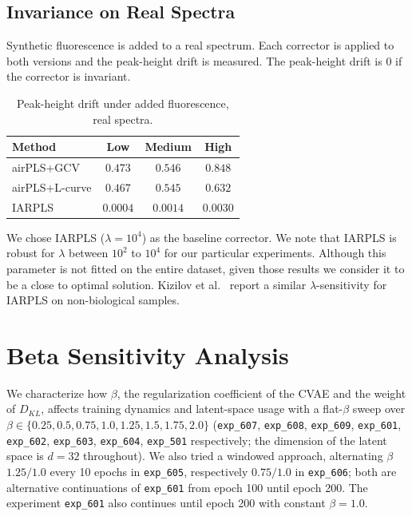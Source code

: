 \subsection*{Invariance on Real Spectra}
Synthetic fluorescence is added to a real spectrum. Each corrector is applied to both versions and the peak-height drift is measured. The peak-height drift is 0 if the corrector is invariant.

\begin{table}[H]
\centering
\small
\begin{tabular*}{\textwidth}{@{\extracolsep{\fill}}lccc}
\toprule
Method & Low & Medium & High \\
\midrule
airPLS+GCV & $0.473$ & $0.546$ & $0.848$ \\
airPLS+L-curve & $0.467$ & $0.545$ & $0.632$ \\
IARPLS & $0.0004$ & $0.0014$ & $0.0030$ \\
\bottomrule
\end{tabular*}
\caption{\small Peak-height drift under added fluorescence, real spectra.}
\label{tab:baseline_invariance}
\end{table}

We chose IARPLS ($\lambda=10^4$) as the baseline corrector. We note that IARPLS is robust for $\lambda$ between $10^2$ to $10^4$ for our particular experiments. Although this parameter is not fitted on the entire dataset, given those results we consider it to be a close to optimal solution. Kizilov et al.~\cite{Kizilov2026} report a similar $\lambda$-sensitivity for IARPLS on non-biological samples.

\newpage
\section{Beta Sensitivity Analysis}
\label{app:beta_sensitivity}
\setcounter{table}{0}
\renewcommand{\thetable}{\Alph{section}.\arabic{table}}
\setcounter{figure}{0}
\renewcommand{\thefigure}{\Alph{section}.\arabic{figure}}

We characterize how $\beta$, the regularization coefficient of the CVAE and the weight of $D_{KL}$, affects training dynamics and latent-space usage with a flat-$\beta$ sweep over $\beta\in\{0.25,0.5,0.75,1.0,1.25,1.5,1.75,2.0\}$ (\texttt{exp\_607}, \texttt{exp\_608}, \texttt{exp\_609}, \texttt{exp\_601}, \texttt{exp\_602}, \texttt{exp\_603}, \texttt{exp\_604}, \texttt{exp\_501} respectively; the dimension of the latent space is $d=32$ throughout). We also tried a windowed approach, alternating $\beta$ $1.25/1.0$ every 10 epochs in \texttt{exp\_605}, respectively $0.75/1.0$ in \texttt{exp\_606}; both are alternative continuations of \texttt{exp\_601} from epoch 100 until epoch 200. The experiment \texttt{exp\_601} also continues until epoch 200 with constant $\beta=1.0$.


